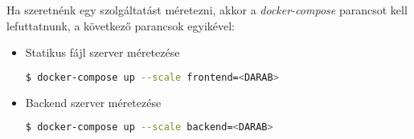 Ha szeretnénk egy szolgáltatást méretezni, akkor a \emph{docker-compose} parancsot kell lefuttatnunk, a következő parancsok egyikével:

\begin{itemize}
    \item Statikus fájl szerver méretezése
    \begin{lstlisting}[language=bash]
        $ docker-compose up --scale frontend=<DARAB>
    \end{lstlisting}
    \item Backend szerver méretezése
    \begin{lstlisting}[language=bash]
        $ docker-compose up --scale backend=<DARAB>
    \end{lstlisting}
\end{itemize}
    

